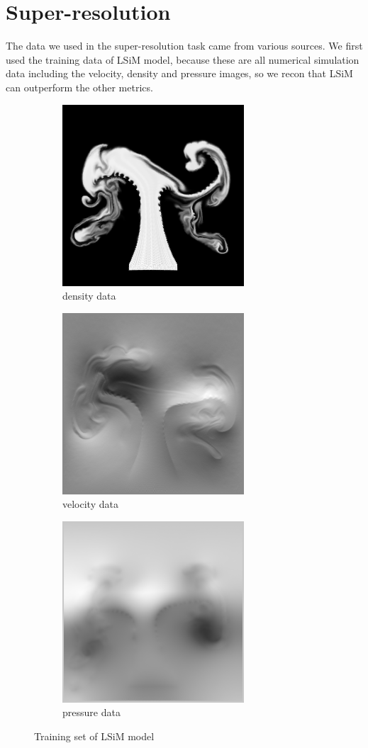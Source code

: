 \documentclass[a4paper,12pt,twoside]{report}
\begin{document}
\section{Super-resolution}
The data we used in the super-resolution task came from various sources. We first used the training data of LSiM model, because these are all numerical simulation data including the velocity, density and pressure images, so we recon that LSiM can outperform the other metrics.
\begin{figure}
\centering
\begin{subfigure}{0.3\textwidth}
  \centering
  \includegraphics[scale=0.5]{density.png}
  \caption{density data}
\end{subfigure}
\begin{subfigure}{0.3\textwidth}
  \centering
  \includegraphics[scale=0.5]{velocity.png}
  \caption{velocity data}
\end{subfigure}
\begin{subfigure}{0.3\textwidth}
  \centering
  \includegraphics[scale=0.5]{pressure.png}
  \caption{pressure data}
\end{subfigure}
\caption{Training set of LSiM model}
\end{figure}
\end{document}
